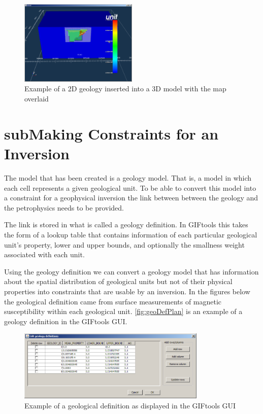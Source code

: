\begin{figure} [h]
    \centering
    \includegraphics[width=0.5\textwidth]{images/MaptoModel/mapModelCross3D.PNG}
    \caption{Example of a 2D geology inserted into a 3D model with the map overlaid}
    \label{fig:mapModelCross3D}
\end{figure}
\FloatBarrier
\section{subMaking Constraints for an Inversion}
\label{subsec:Making Constraints for and Inversion}

The model that has been created is a geology model. That is, a model in which each cell represents a given geological unit. To be able to convert this model into a constraint for a geophysical inversion the link between between the geology and the petrophysics needs to be provided. 

The link is stored in what is called a geology definition. In GIFtools this takes the form of a lookup table that contains information of each particular geological unit's property, lower and upper bounds, and optionally the smallness weight associated with each unit. 

Using the geology definition we can convert a geology model that has information about the spatial distribution of geological units but not of their physical properties into constraints that are usable by an inversion. In the figures below the geological definition came from surface measurements of magnetic susceptibility within each geological unit. \autoref{fig:geoDefPlan} is an example of a geology definition in the GIFtools GUI.
\begin{figure} [h]
    \centering
    \includegraphics[width=0.8\textwidth]{images/MaptoModel/geoDefPlan.PNG}
    \caption{Example of a geological definition as displayed in the GIFtools GUI}
    \label{fig:geoDefPlan}
\end{figure}


